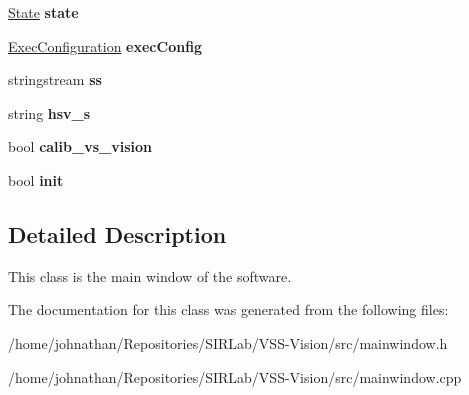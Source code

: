 \begin{DoxyCompactItemize}
\item 
\hyperlink{structcommon_1_1State}{State} {\bfseries state}\hypertarget{classMainWindow_a5eee26949e66f69193d9858771c482fc}{}\label{classMainWindow_a5eee26949e66f69193d9858771c482fc}

\item 
\hyperlink{structcommon_1_1ExecConfiguration}{Exec\+Configuration} {\bfseries exec\+Config}\hypertarget{classMainWindow_aa43de17b014bc536003744e375edbdfa}{}\label{classMainWindow_aa43de17b014bc536003744e375edbdfa}

\item 
stringstream {\bfseries ss}\hypertarget{classMainWindow_a54b6cd90f16d24527b304706581914b2}{}\label{classMainWindow_a54b6cd90f16d24527b304706581914b2}

\item 
string {\bfseries hsv\+\_\+s}\hypertarget{classMainWindow_a37fe4fad93ad48280423790a7a6ec91b}{}\label{classMainWindow_a37fe4fad93ad48280423790a7a6ec91b}

\item 
bool {\bfseries calib\+\_\+vs\+\_\+vision}\hypertarget{classMainWindow_abe010ee26a578d28fdd957bb622ba6e1}{}\label{classMainWindow_abe010ee26a578d28fdd957bb622ba6e1}

\item 
bool {\bfseries init}\hypertarget{classMainWindow_a851cc4123139bb6d049f4e1e05e3bcc9}{}\label{classMainWindow_a851cc4123139bb6d049f4e1e05e3bcc9}

\end{DoxyCompactItemize}


\subsection{Detailed Description}
This class is the main window of the software. 

The documentation for this class was generated from the following files\+:\begin{DoxyCompactItemize}
\item 
/home/johnathan/\+Repositories/\+S\+I\+R\+Lab/\+V\+S\+S-\/\+Vision/src/mainwindow.\+h\item 
/home/johnathan/\+Repositories/\+S\+I\+R\+Lab/\+V\+S\+S-\/\+Vision/src/mainwindow.\+cpp\end{DoxyCompactItemize}
